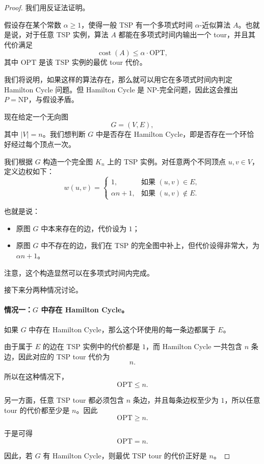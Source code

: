 \documentclass[UTF8,openany,12pt]{ctexbook}
\theoremstyle{remark}
\newcommand{\OPT}{\mathrm{OPT}}
\newcommand{\NP}{\mathrm{NP}}
\begin{document}
\begin{proof}
我们用反证法证明。

假设存在某个常数 $\alpha \ge 1$，使得一般 TSP 有一个多项式时间
$\alpha$-近似算法 $A$。也就是说，对于任意 TSP 实例，算法 $A$ 都能在多项式时间内输出一个 tour，并且其代价满足
\[
\operatorname{cost}(A) \le \alpha \cdot \OPT,
\]
其中 $\OPT$ 是该 TSP 实例的最优 tour 代价。

我们将说明，如果这样的算法存在，那么就可以用它在多项式时间内判定
Hamilton Cycle 问题。但 Hamilton Cycle 是 $\NP$-完全问题，因此这会推出
$P=\NP$，与假设矛盾。

现在给定一个无向图
\[
G=(V,E),
\]
其中 $|V|=n$。我们想判断 $G$ 中是否存在 Hamilton Cycle，即是否存在一个环恰好经过每个顶点一次。

我们根据 $G$ 构造一个完全图 $K_n$ 上的 TSP 实例。对任意两个不同顶点
$u,v \in V$，定义边权如下：
\[
w(u,v)=
\begin{cases}
1, & \text{如果 } (u,v)\in E,\\
\alpha n + 1, & \text{如果 } (u,v)\notin E.
\end{cases}
\]

也就是说：

\begin{itemize}
    \item 原图 $G$ 中本来存在的边，代价设为 $1$；
    \item 原图 $G$ 中不存在的边，我们在 TSP 的完全图中补上，但代价设得非常大，为 $\alpha n+1$。
\end{itemize}

注意，这个构造显然可以在多项式时间内完成。

接下来分两种情况讨论。

\paragraph{情况一：$G$ 中存在 Hamilton Cycle。}

如果 $G$ 中存在 Hamilton Cycle，那么这个环使用的每一条边都属于 $E$。

由于属于 $E$ 的边在 TSP 实例中的代价都是 $1$，而 Hamilton Cycle 一共包含
$n$ 条边，因此对应的 TSP tour 代价为
\[
n.
\]

所以在这种情况下，
\[
\OPT \le n.
\]

另一方面，任意 TSP tour 都必须包含 $n$ 条边，并且每条边权至少为 $1$，所以任意 tour 的代价都至少是 $n$。因此
\[
\OPT \ge n.
\]

于是可得
\[
\OPT = n.
\]

因此，若 $G$ 有 Hamilton Cycle，则最优 TSP tour 的代价正好是 $n$。


\end{proof}
\end{document}
